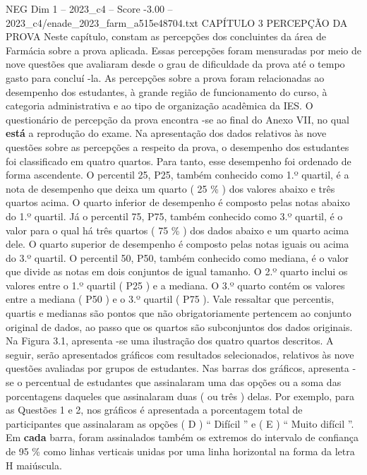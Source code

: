 \begin{textsample}{NEG Dim 1 – 2023\_c4 – Score -3.00 – 2023\_c4/enade\_2023\_farm\_a515e48704.txt}  \label{ex:f1_neg_245}
CAPÍTULO 3 PERCEPÇÃO DA PROVA Neste capítulo, constam as percepções dos concluintes da área de Farmácia sobre a prova aplicada.
Essas percepções foram mensuradas por meio de nove questões que avaliaram desde o grau de dificuldade da prova até o tempo gasto para concluí -la.
As percepções sobre a prova foram relacionadas ao desempenho dos estudantes, à grande região de funcionamento do curso, à categoria administrativa e ao tipo de organização acadêmica da IES.
O questionário de percepção da prova encontra -se ao final do Anexo VII, no qual \textbf{está} a reprodução do exame.
Na apresentação dos dados relativos às nove questões sobre as percepções a respeito da prova, o desempenho dos estudantes foi classificado em quatro quartos.
Para tanto, esse desempenho foi ordenado de forma ascendente.
O percentil 25, P25, também conhecido como 1.º quartil, é a nota de desempenho que deixa um quarto ( 25 \% ) dos valores abaixo e três quartos acima.
O quarto inferior de desempenho é composto pelas notas abaixo do 1.º quartil.
Já o percentil 75, P75, também conhecido como 3.º quartil, é o valor para o qual há três quartos ( 75 \% ) dos dados abaixo e um quarto acima dele.
O quarto superior de desempenho é composto pelas notas iguais ou acima do 3.º quartil.
O percentil 50, P50, também conhecido como mediana, é o valor que divide as notas em dois conjuntos de igual tamanho.
O 2.º quarto inclui os valores entre o 1.º quartil ( P25 ) e a mediana.
O 3.º quarto contém os valores entre a mediana ( P50 ) e o 3.º quartil ( P75 ).
Vale ressaltar que percentis, quartis e medianas são pontos que não obrigatoriamente pertencem ao conjunto original de dados, ao passo que os quartos são subconjuntos dos dados originais.
Na Figura 3.1, apresenta -se uma ilustração dos quatro quartos descritos.
A seguir, serão apresentados gráficos com resultados selecionados, relativos às nove questões avaliadas por grupos de estudantes.
Nas barras dos gráficos, apresenta -se o percentual de estudantes que assinalaram uma das opções ou a soma das porcentagens daqueles que assinalaram duas ( ou três ) delas.
Por exemplo, para as Questões 1 e 2, nos gráficos é apresentada a porcentagem total de participantes que assinalaram as opções ( D ) “ Difícil ” e ( E ) “ Muito difícil ”.
Em \textbf{cada} barra, foram assinalados também os extremos do intervalo de confiança de 95 \% como linhas verticais unidas por uma linha horizontal na forma da letra H maiúscula.

\end{textsample}
